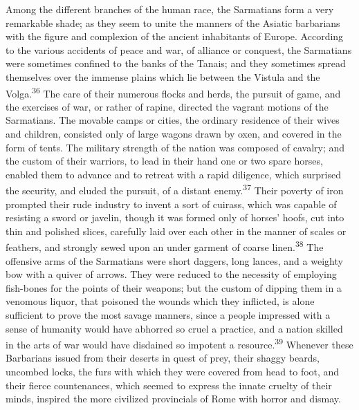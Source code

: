 Among the different branches of the human race, the Sarmatians
form a very remarkable shade; as they seem to unite the manners
of the Asiatic barbarians with the figure and complexion of the
ancient inhabitants of Europe. According to the various accidents
of peace and war, of alliance or conquest, the Sarmatians were
sometimes confined to the banks of the Tanais; and they sometimes
spread themselves over the immense plains which lie between the
Vistula and the Volga.\textsuperscript{36} The care of their numerous flocks and
herds, the pursuit of game, and the exercises of war, or rather
of rapine, directed the vagrant motions of the Sarmatians. The
movable camps or cities, the ordinary residence of their wives
and children, consisted only of large wagons drawn by oxen, and
covered in the form of tents. The military strength of the nation
was composed of cavalry; and the custom of their warriors, to
lead in their hand one or two spare horses, enabled them to
advance and to retreat with a rapid diligence, which surprised
the security, and eluded the pursuit, of a distant enemy.\textsuperscript{37}
Their poverty of iron prompted their rude industry to invent a
sort of cuirass, which was capable of resisting a sword or
javelin, though it was formed only of horses’ hoofs, cut into
thin and polished slices, carefully laid over each other in the
manner of scales or feathers, and strongly sewed upon an under
garment of coarse linen.\textsuperscript{38} The offensive arms of the Sarmatians
were short daggers, long lances, and a weighty bow with a quiver
of arrows. They were reduced to the necessity of employing
fish-bones for the points of their weapons; but the custom of
dipping them in a venomous liquor, that poisoned the wounds which
they inflicted, is alone sufficient to prove the most savage
manners, since a people impressed with a sense of humanity would
have abhorred so cruel a practice, and a nation skilled in the
arts of war would have disdained so impotent a resource.\textsuperscript{39}
Whenever these Barbarians issued from their deserts in quest of
prey, their shaggy beards, uncombed locks, the furs with which
they were covered from head to foot, and their fierce
countenances, which seemed to express the innate cruelty of their
minds, inspired the more civilized provincials of Rome with
horror and dismay.


